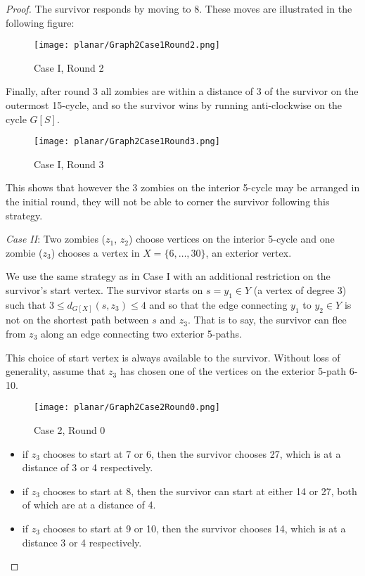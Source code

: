 \begin{proof}
The survivor responds by moving to 8. These moves are illustrated in the following figure:

\begin{figure}[h!]
\centering
\texttt{[image: planar/Graph2Case1Round2.png]}
\caption{Case I, Round 2} \label{fig:planarG5}
\end{figure}

\newpage

Finally, after round 3 all zombies are within a distance of 3 of the survivor on the outermost 15-cycle, and so the survivor wins by running anti-clockwise
on the cycle $G[S]$.

\begin{figure}[h!]
\centering
\texttt{[image: planar/Graph2Case1Round3.png]}
\caption{Case I, Round 3} \label{fig:planarG6}
\end{figure}

This shows that however the 3 zombies on the interior 5-cycle may be arranged in the initial round, they will not be able to corner the survivor following this
strategy.

\newpage

\textit{Case II}: Two zombies ($z_1$, $z_2$) choose vertices on the interior 5-cycle and one zombie ($z_3$) chooses a vertex in $X = \{ 6, \dots, 30 \}$,
an exterior vertex.

We use the same strategy as in Case I with an additional restriction on the survivor's start vertex.
The survivor starts on $s = y_1 \in Y$  (a vertex of degree 3) such that $3 \leq d_{G[X]}(s, z_3) \leq 4$ and so that the edge connecting $y_1$ to $y_2 \in Y$
is not on the shortest path between $s$ and $z_3$. That is to say, the survivor can flee from $z_3$ along an edge connecting two exterior 5-paths.

This choice of start vertex is always available to the survivor. Without loss of generality, assume that $z_3$ has chosen one of the vertices on the
exterior 5-path 6-10.

\begin{figure}[h!]
\centering
\texttt{[image: planar/Graph2Case2Round0.png]}
\caption{Case 2, Round 0} \label{fig:planarG2Case2}
\end{figure}

\begin{itemize}
\item if $z_3$ chooses to start at 7 or 6, then the survivor chooses 27, which is at a distance of 3 or 4 respectively.
\item if $z_3$ chooses to start at 8, then the survivor can start at either 14 or 27, both of which are at a distance of 4.
\item if $z_3$ chooses to start at 9 or 10, then the survivor chooses 14, which is at a distance 3 or 4 respectively.
\end{itemize}


\end{proof}
